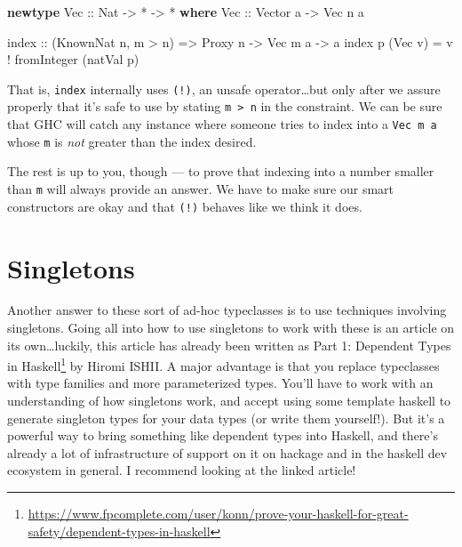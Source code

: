 \documentclass[]{article}
\newenvironment{Shaded}{}{}
\newcommand{\DataTypeTok}[1]{\textcolor[rgb]{0.56,0.13,0.00}{#1}}
\newcommand{\FunctionTok}[1]{\textcolor[rgb]{0.02,0.16,0.49}{#1}}
\newcommand{\KeywordTok}[1]{\textcolor[rgb]{0.00,0.44,0.13}{\textbf{#1}}}
\newcommand{\NormalTok}[1]{#1}
\newcommand{\OperatorTok}[1]{\textcolor[rgb]{0.40,0.40,0.40}{#1}}
\newcommand{\OtherTok}[1]{\textcolor[rgb]{0.00,0.44,0.13}{#1}}
\renewcommand{\href}[2]{#2\footnote{\url{#1}}}
\begin{document}
\begin{Shaded}
\begin{Highlighting}[]
\KeywordTok{newtype} \DataTypeTok{Vec}\OtherTok{ ::} \DataTypeTok{Nat} \OtherTok{{-}\textgreater{}} \OperatorTok{*} \OtherTok{{-}\textgreater{}} \OperatorTok{*} \KeywordTok{where}
    \DataTypeTok{Vec}\OtherTok{ ::} \DataTypeTok{Vector}\NormalTok{ a }\OtherTok{{-}\textgreater{}} \DataTypeTok{Vec}\NormalTok{ n a}

\FunctionTok{index}\OtherTok{ ::}\NormalTok{ (}\DataTypeTok{KnownNat}\NormalTok{ n, m }\OperatorTok{\textgreater{}}\NormalTok{ n) }\OtherTok{=\textgreater{}} \DataTypeTok{Proxy}\NormalTok{ n }\OtherTok{{-}\textgreater{}} \DataTypeTok{Vec}\NormalTok{ m a }\OtherTok{{-}\textgreater{}}\NormalTok{ a}
\FunctionTok{index}\NormalTok{ p (}\DataTypeTok{Vec}\NormalTok{ v) }\OtherTok{=}\NormalTok{ v }\OperatorTok{!} \FunctionTok{fromInteger}\NormalTok{ (natVal p)}
\end{Highlighting}
\end{Shaded}

That is, \texttt{index} internally uses \texttt{(!)}, an unsafe
operator\ldots but only after we assure properly that it's safe to use by
stating \texttt{m\ \textgreater{}\ n} in the constraint. We can be sure that GHC
will catch any instance where someone tries to index into a \texttt{Vec\ m\ a}
whose \texttt{m} is \emph{not} greater than the index desired.

The rest is up to you, though --- to prove that indexing into a number smaller
than \texttt{m} will always provide an answer. We have to make sure our smart
constructors are okay and that \texttt{(!)} behaves like we think it does.

\section{Singletons}\label{singletons}

Another answer to these sort of ad-hoc typeclasses is to use techniques
involving singletons. Going all into how to use singletons to work with these is
an article on its own\ldots luckily, this article has already been written as
\href{https://www.fpcomplete.com/user/konn/prove-your-haskell-for-great-safety/dependent-types-in-haskell}{Part
1: Dependent Types in Haskell} by Hiromi ISHII. A major advantage is that you
replace typeclasses with type families and more parameterized types. You'll have
to work with an understanding of how singletons work, and accept using some
template haskell to generate singleton types for your data types (or write them
yourself!). But it's a powerful way to bring something like dependent types into
Haskell, and there's already a lot of infrastructure of support on it on hackage
and in the haskell dev ecosystem in general. I recommend looking at the linked
article!
\end{document}
